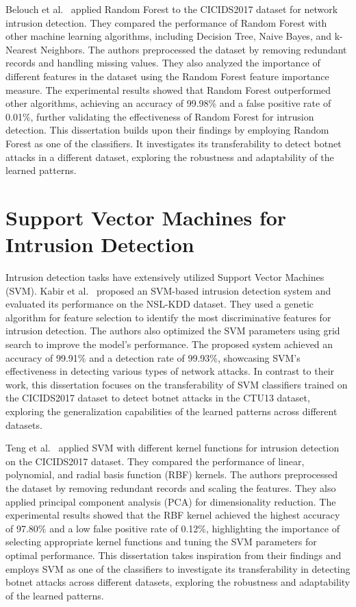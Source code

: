 Belouch et al.~\cite{belouch2018performance} applied Random Forest to the CICIDS2017 dataset for network intrusion detection. They compared the performance of Random Forest with other machine learning algorithms, including Decision Tree, Naive Bayes, and k-Nearest Neighbors. The authors preprocessed the dataset by removing redundant records and handling missing values. They also analyzed the importance of different features in the dataset using the Random Forest feature importance measure. The experimental results showed that Random Forest outperformed other algorithms, achieving an accuracy of 99.98\% and a false positive rate of 0.01\%, further validating the effectiveness of Random Forest for intrusion detection. This dissertation builds upon their findings by employing Random Forest as one of the classifiers. It investigates its transferability to detect botnet attacks in a different dataset, exploring the robustness and adaptability of the learned patterns.

\section{Support Vector Machines for Intrusion Detection}

Intrusion detection tasks have extensively utilized Support Vector Machines (SVM). Kabir et al.~\cite{kabir2017network} proposed an SVM-based intrusion detection system and evaluated its performance on the NSL-KDD dataset. They used a genetic algorithm for feature selection to identify the most discriminative features for intrusion detection. The authors also optimized the SVM parameters using grid search to improve the model's performance. The proposed system achieved an accuracy of 99.91\% and a detection rate of 99.93\%, showcasing SVM's effectiveness in detecting various types of network attacks. In contrast to their work, this dissertation focuses on the transferability of SVM classifiers trained on the CICIDS2017 dataset to detect botnet attacks in the CTU13 dataset, exploring the generalization capabilities of the learned patterns across different datasets.

Teng et al.~\cite{teng2017svm} applied SVM with different kernel functions for intrusion detection on the CICIDS2017 dataset. They compared the performance of linear, polynomial, and radial basis function (RBF) kernels. The authors preprocessed the dataset by removing redundant records and scaling the features. They also applied principal component analysis (PCA) for dimensionality reduction. The experimental results showed that the RBF kernel achieved the highest accuracy of 97.80\% and a low false positive rate of 0.12\%, highlighting the importance of selecting appropriate kernel functions and tuning the SVM parameters for optimal performance. This dissertation takes inspiration from their findings and employs SVM as one of the classifiers to investigate its transferability in detecting botnet attacks across different datasets, exploring the robustness and adaptability of the learned patterns.

